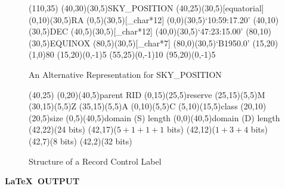 \documentclass[twoside,11pt]{starlink}
\begin{document}
\small
\begin{terminalv}
\begin{figure}
  \begin{center}
    \begin{picture}(110,35)
      \thicklines
      \put (40,30){\framebox(30,5){SKY\_POSITION}}
      \put (40,25){\framebox(30,5){[equatorial]}}
      \put (0,10){\framebox(30,5){RA}}
      \put (0,5){\framebox(30,5){[\_char*12]}}
      \put (0,0){\framebox(30,5){`10:59:17.20'}}
      \put (40,10){\framebox(30,5){DEC}}
      \put (40,5){\framebox(30,5){[\_char*12]}}
      \put (40,0){\framebox(30,5){`47:23:15.00'}}
      \put (80,10){\framebox(30,5){EQUINOX}}
      \put (80,5){\framebox(30,5){[\_char*7]}}
      \put (80,0){\framebox(30,5){`B1950.0'}}
      \put (15,20){\line(1,0){80}}
      \put (15,20){\vector(0,-1){5}}
      \put (55,25){\vector(0,-1){10}}
      \put (95,20){\vector(0,-1){5}}
    \end{picture}
    \caption{An Alternative Representation for SKY\_POSITION}
    \label{an_alternative_representation_for_sky_position}
  \end{center}
\end{figure}

\begin{figure}
  \begin{center}
    \begin{picture}(40,25)
      \thicklines
      \put (0,20){\framebox(40,5){parent RID}}
      \put (0,15){\framebox(25,5){reserve}}
      \put (25,15){\framebox(5,5){M}}
      \put (30,15){\framebox(5,5){Z}}
      \put (35,15){\framebox(5,5){A}}
      \put (0,10){\framebox(5,5){C}}
      \put (5,10){\framebox(15,5){class}}
      \put (20,10){\framebox(20,5){size}}
      \put (0,5){\framebox(40,5){domain (S) length}}
      \put (0,0){\framebox(40,5){domain (D) length}}
      \put (42,22){(24 bits)}
      \put (42,17){($5+1+1+1$ bits)}
      \put (42,12){($1+3+4$ bits)}
      \put (42,7){(8 bits)}
      \put (42,2){(32 bits)}
    \end{picture}
    \caption{Structure of a Record Control Label}
    \label{structure_of_a_record_control_label}
  \end{center}
\end{figure}
\end{terminalv}
\normalsize

\newpage

\begin{center}
  \textbf{\LaTeX\ OUTPUT}
\end{center}
\end{document}
